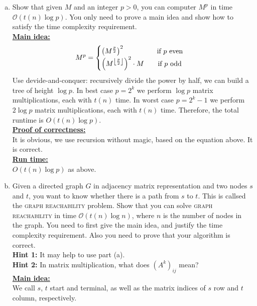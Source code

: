 \documentclass{article}\usepackage[utf8]{inputenc}\usepackage[margin=0.4cm,top=0.4cm,bottom=0.4cm]{geometry}\usepackage[usenames,dvipsnames,svgnames,table]{xcolor}
\DeclarePairedDelimiter\floor{\lfloor}{\rfloor}
\begin{document}
\vspace{4pt}
\begin{enumerate}[(a)]
\item Show that given $M$ and an integer $p>0$, you can computer $M^p$ in time $\mathcal{O}{(t(n)\log{p})}$. You only need to prove a main idea and show how to satisfy the time complexity requirement.
\BeginSolution %
\\
\underline{\textbf{Main idea:}}
%
\begin{equation*}
	M^p = \begin{cases}
	\left( M^{\frac{p}{2}} \right)^2 \ \ \qquad\qquad \text{if $p$ even}\\
	\left( M^{\floor* {\frac{p}{2}}} \right)^2 \cdot M \qquad \text{if $p$ odd}
	\end{cases}
\end{equation*}
%
Use devide-and-conquer: recursively divide the power by half, we can build a tree of height $\log p$. In best case $p = 2^k$ we perform $\log p$ matrix multiplications, each with $t(n)$ time. In worst case $p = 2^k - 1$ we perform $2\log p$ matrix multiplications, each with $t(n)$ time. Therefore, the total runtime is $O(t(n)\log p)$.\\
\underline{\textbf{Proof of correctness:}}
\\
It is obvious, we use recursion without magic, based on the equation above. It is correct.\\
\underline{\textbf{Run time:}}
\\
$O(t(n)\log p)$ as above.
\EndSolution
\item Given a directed graph $G$ in adjacency matrix representation and two nodes $s$ and $t$, you want to know whether there is a path from $s$ to $t$. This is callsed the \textsc{graph reachability} problem. Show that you can solve \textsc{graph reachability} in time $\mathcal{O}{(t(n)\log{n})}$, where $n$ is the number of nodes in the graph. You need to first give the main idea, and justify the time complexity requirement. Also you need to prove that your algorithm is correct.\\
\textbf{Hint 1:} It may help to use part (a).\\
\textbf{Hint 2:} In matrix multiplication, what does ${(A^k)}_{ij}$ mean?
\BeginSolution %
\\
\underline{\textbf{Main idea:}}
\\
We call $s$, $t$ start and terminal, as well as the matrix indices of $s$ row and $t$ column, respectively.\\

\end{enumerate}
\end{document}
